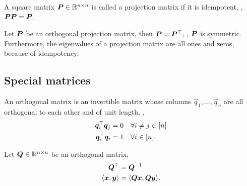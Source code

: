 \documentclass[justified,nobib]{tufte-handout}
\newcommand{\ang}[1]{\langle #1 \rangle}
\begin{document}
\begin{definition}
    A square matrix $\bm{P} \in \mathbb{R}^{n\times n}$ is called a projection matrix if it is idempotent, \ie,
    $\bm{P}\bm{P} = \bm{P}$.
\end{definition}

\begin{properties}
    Let $\bm{P}$ be an orthogonal projection matrix, then $\bm{P} = \bm{P}^\top$, \ie, $\bm{P}$
    is symmetric. Furthermore, the eigenvalues of a projection matrix are all ones and zeros, because of idempotency.
\end{properties}

\subsection{Special matrices}

\begin{definition}
    An orthogonal matrix is an invertible matrix whose columns $\vec{q}_1,\ldots,\vec{q}_n$ are all orthogonal
    to each other and of unit length, \ie,
    \begin{align*}
        \bm{q}_i^\top \bm{q}_j &= 0 \quad \forall i \neq j \in [n] \\
        \bm{q}_i^\top \bm{q}_i &= 1 \quad \forall i \in [n].
    \end{align*}
\end{definition}

\begin{properties}
    Let $\bm{Q}\in \mathbb{R}^{n\times n}$ be an orthogonal matrix,
    \begin{align*}
        \transpose{\mat{Q}} &= \inv{\mat{Q}} \\
        \ang{\vec{x},\vec{y}} &= \ang{\mat{Q}\vec{x}, \mat{Q}\vec{y}}.
    \end{align*}
\end{properties}

\newpage


\end{document}
